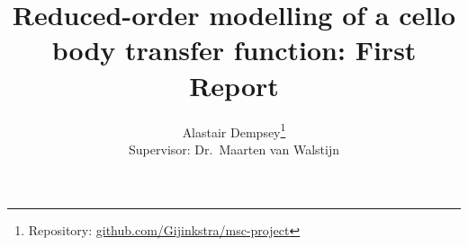 

\title{Reduced-order modelling of a cello body transfer function: First Report}
\author{Alastair Dempsey\thanks{
Repository: \href{https://github.com/Gijinkstra/msc-project}
{github.com/Gijinkstra/msc-project}} \\
[1cm]{\small Supervisor: Dr.\ Maarten van Walstijn}}


\maketitle
\newpage
\tableofcontents
\newpage







\newpage



